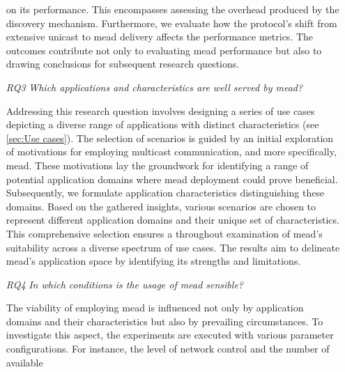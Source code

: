 \begin{enumerate}
            on its performance.
        This encompasses assessing the overhead produced by the discovery
            mechanism.
        Furthermore, we evaluate how the protocol's shift from extensive
            unicast to \gls{mead} delivery affects the performance metrics.
        The outcomes contribute not only to evaluating \gls{mead} performance but
            also to drawing conclusions for subsequent research questions.
        \item[\textit{RQ3}]\label{rq3}
        \textit{Which applications and characteristics are well served by
        \gls{mead}?}\par
        Addressing this research question involves designing a series of 
            use cases depicting a diverse range of applications with distinct
            characteristics (see \autoref{sec:Use cases}).
        The selection of scenarios is guided by an initial exploration of
            motivations for employing multicast communication, and more
            specifically, \gls{mead}.
        These motivations lay the groundwork for identifying a range of
            potential application domains where \gls{mead} deployment could prove
            beneficial.
        Subsequently, we formulate application characteristics distinguishing
            these domains.
        Based on the gathered insights, various scenarios are chosen to
            represent different application domains and their unique set of
            characteristics.
        This comprehensive selection ensures a throughout examination of
            \gls{mead}'s suitability across a diverse spectrum of use cases.
        The results aim to delineate \gls{mead}'s application space by
            identifying its strengths and limitations.
    \item[\textit{RQ4}] \label{rq4}
        \textit{In which conditions is the usage of \gls{mead} sensible?}\par
        The viability of employing \gls{mead} is influenced not only by
            application domains and their characteristics but also by
            prevailing circumstances.
        To investigate this aspect, the experiments are executed with various
            parameter configurations.
        For instance, the level of network control and the number of available

\end{enumerate}
